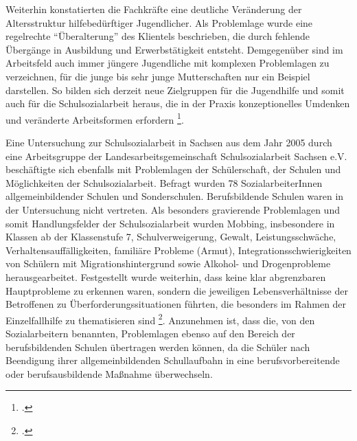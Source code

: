 Weiterhin konstatierten die Fachkräfte eine deutliche Veränderung der Altersstruktur hilfebedürftiger Jugendlicher. Als Problemlage wurde eine regelrechte "`Überalterung"' des Klientels beschrieben, die durch fehlende Übergänge in Ausbildung und Erwerbstätigkeit entsteht. Demgegenüber sind im Arbeitsfeld auch immer jüngere Jugendliche mit komplexen Problemlagen zu verzeichnen, für die junge bis sehr junge Mutterschaften nur ein Beispiel darstellen. So bilden sich derzeit neue Zielgruppen für die Jugendhilfe und somit auch für die Schulsozialarbeit heraus, die in der Praxis konzeptionelles Umdenken und veränderte Arbeitsformen erfordern \footcite[vgl.][142ff]{UniversitaetLeipzig2007}.
 
Eine Untersuchung zur Schulsozialarbeit in Sachsen aus dem Jahr 2005 durch eine Arbeitsgruppe der Landesarbeitsgemeinschaft Schulsozialarbeit Sachsen e.V. beschäftigte sich ebenfalls mit Problemlagen der Schülerschaft, der Schulen und Möglichkeiten der Schulsozialarbeit. Befragt wurden 78 SozialarbeiterInnen allgemeinbildender Schulen und Sonderschulen. Berufsbildende Schulen waren in der Untersuchung nicht vertreten. Als besonders gravierende Problemlagen und somit Handlungsfelder der Schulsozialarbeit wurden Mobbing, insbesondere in Klassen ab der Klassenstufe 7, Schulverweigerung, Gewalt, Leistungsschwäche, Verhaltensauffälligkeiten, familiäre Probleme (Armut), Integrationsschwierigkeiten von Schülern mit Migrationshintergrund sowie Alkohol- und Drogenprobleme herausgearbeitet. Festgestellt wurde weiterhin, dass keine klar abgrenzbaren Hauptprobleme zu erkennen waren, sondern die jeweiligen Lebensverhältnisse der Betroffenen zu Überforderungssituationen führten, die besonders im Rahmen der Einzelfallhilfe zu thematisieren sind \footcite[vgl.][63ff]{Lang2010}. Anzunehmen ist, dass die, von den Sozialarbeitern benannten, Problemlagen ebenso auf den Bereich der berufsbildenden Schulen übertragen werden können, da die Schüler nach Beendigung ihrer allgemeinbildenden Schullaufbahn in eine berufsvorbereitende oder berufsausbildende Maßnahme überwechseln.

